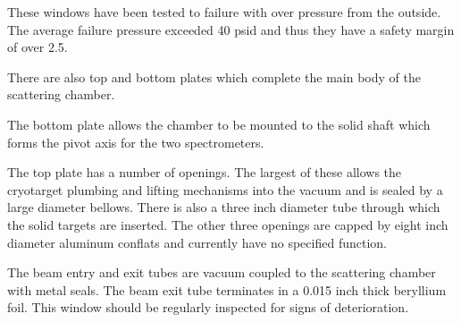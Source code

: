 {These windows have been tested to failure with over pressure from the
outside.  The average failure pressure exceeded 40 psid and thus they
have a safety margin of over 2.5.  

There are also top and bottom plates which complete the main body of the
scattering chamber.

The bottom plate allows the chamber to be mounted to the
solid shaft which forms the pivot axis for the two spectrometers.


The top plate has a number of openings. The largest of these allows
the cryotarget plumbing and lifting mechanisms into the vacuum and is sealed by
a large diameter bellows. There is also a three inch diameter tube through
which the solid targets are inserted.
The other three openings are capped by eight inch diameter aluminum
conflats and currently have no specified function.

The beam entry and exit tubes are vacuum coupled to the scattering chamber with
metal seals. The beam exit tube terminates in a 0.015 inch thick beryllium foil.
This window should be regularly inspected for signs of deterioration.

}
